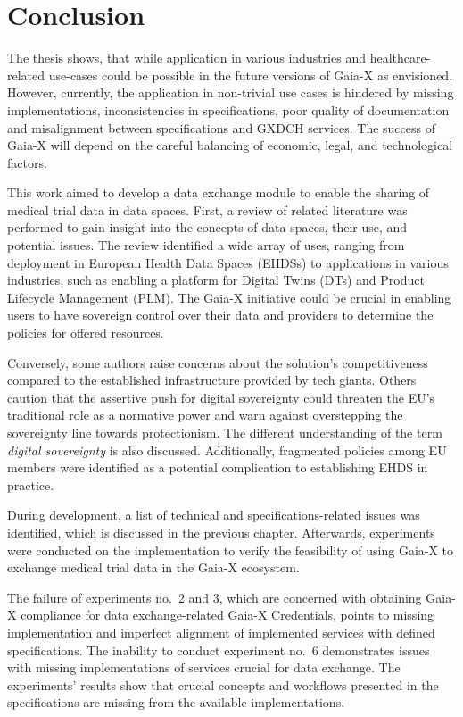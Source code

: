 \chapter{Conclusion}\label{ch:conclusion}

The thesis shows, that while application in various industries and healthcare-related use-cases could be possible in the future versions of Gaia-X as envisioned.
However, currently, the application in non-trivial use cases is hindered by missing implementations, inconsistencies in specifications, poor quality of documentation and misalignment between specifications and GXDCH services.
The success of Gaia-X will depend on the careful balancing of economic, legal, and technological factors.

This work aimed to develop a data exchange module to enable the sharing of medical trial data in data spaces.
First, a review of related literature was performed to gain insight into the concepts of data spaces, their use, and potential issues.
The review identified a wide array of uses, ranging from deployment in European Health Data Spaces (EHDSs) to applications in various industries, such as enabling a platform for Digital Twins (DTs) and Product Lifecycle Management (PLM).
The Gaia-X initiative could be crucial in enabling users to have sovereign control over their data and providers to determine the policies for offered resources.

Conversely, some authors raise concerns about the solution's competitiveness compared to the established infrastructure provided by tech giants.
Others caution that the assertive push for digital sovereignty could threaten the EU's traditional role as a normative power and warn against overstepping the sovereignty line towards protectionism.
The different understanding of the term \textit{digital sovereignty} is also discussed.
Additionally, fragmented policies among EU members were identified as a potential complication to establishing EHDS in practice.

During development, a list of technical and specifications-related issues was identified, which is discussed in the previous chapter.
Afterwards, experiments were conducted on the implementation to verify the feasibility of using Gaia-X to exchange medical trial data in the Gaia-X ecosystem.

The failure of experiments no.~2 and 3, which are concerned with obtaining Gaia-X compliance for data exchange-related Gaia-X Credentials, points to missing implementation and imperfect alignment of implemented services with defined specifications.
The inability to conduct experiment no.~6 demonstrates issues with missing implementations of services crucial for data exchange.
The experiments' results show that crucial concepts and workflows presented in the specifications are missing from the available implementations.

